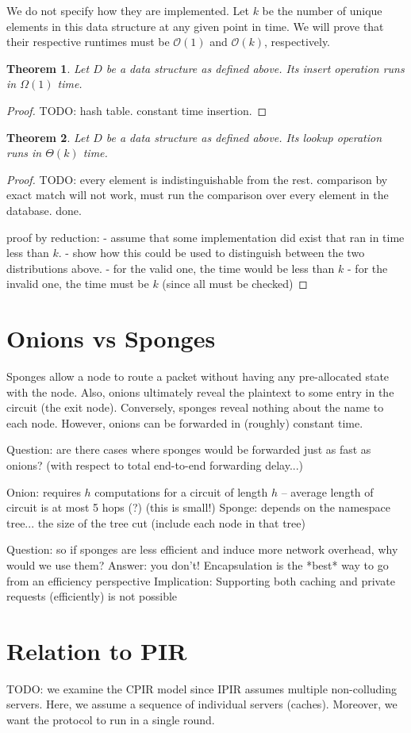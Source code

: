 \documentclass{article}
\newtheorem{thm}{Theorem}
\begin{document}
We do not specify how they are implemented. Let $k$ be the number of unique elements in this
data structure at any given point in time. We will prove that their respective runtimes must 
be $\mathcal{O}(1)$ and $\mathcal{O}(k)$, respectively. 

\begin{thm}
Let $D$ be a data structure as defined above. Its {\sf insert} operation runs in $\Omega(1)$ time.
\end{thm}
\begin{proof}
TODO: hash table. constant time insertion.
\end{proof}

\begin{thm}
Let $D$ be a data structure as defined above. Its {\sf lookup} operation runs in $\Theta(k)$ time.
\end{thm}
\begin{proof}
TODO: every element is indistinguishable from the rest. comparison by exact match will not work, must run
the comparison over every element in the database. done. 

proof by reduction: 
- assume that some implementation did exist that ran in time less than $k$. 
- show how this could be used to distinguish between the two distributions above.
    - for the valid one, the time would be less than $k$
    - for the invalid one, the time must be $k$ (since all must be checked)
\end{proof}

\section{Onions vs Sponges}
Sponges allow a node to route a packet without having any pre-allocated state with 
the node. Also, onions ultimately reveal the plaintext to some entry in the circuit (the 
exit node). Conversely, sponges reveal nothing about the name to each node. However,
onions can be forwarded in (roughly) constant time. 

Question: are there cases where sponges would be forwarded just as fast as onions?
(with respect to total end-to-end forwarding delay...)

Onion: requires $h$ computations for a circuit of length $h$ -- average length of circuit is at most 5 hops (?) (this is small!)
Sponge: depends on the namespace tree... the size of the tree cut (include each node in that tree)

Question: so if sponges are less efficient and induce more network overhead, why would we use them? 
Answer: you don't! Encapsulation is the *best* way to go from an efficiency perspective
Implication: Supporting both caching and private requests (efficiently) is not possible

\section{Relation to PIR}
TODO: we examine the CPIR model since IPIR assumes multiple non-colluding servers. Here, we assume a sequence of 
individual servers (caches). Moreover, we want the protocol to run in a single round. 
\end{document}
